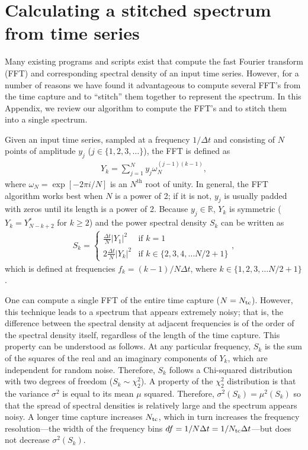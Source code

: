 \chapter{Calculating a stitched spectrum from time series}
\label{App:stitch_spec}

Many existing programs and scripts exist that compute the fast Fourier transform (FFT) and corresponding spectral density of an input time series. However, for a number of reasons we have found it advantageous to compute several FFT's from the time capture and to ``stitch'' them together to represent the spectrum. In this Appendix, we review our algorithm to compute the FFT's and to stitch them into a single spectrum.

Given an input time series, sampled at a frequency $1/\Delta t$ and consisting of $N$ points of amplitude $y_j$ ($j \in \{1, 2, 3, \ldots\}$), the FFT is defined as
\begin{align}\label{eqn:defFFT}
Y_k = \sum_{j=1}^N y_j \omega_N^{(j-1)(k-1)},
\end{align}
where $\omega_N = \exp[-2\pi i/N]$ is an $N^\text{th}$ root of unity. In general, the FFT algorithm works best when $N$ is a power of 2; if it is not, $y_j$ is usually padded with zeros until its length is a power of 2. Because $y_j \in \mathbb{R}$, $Y_k$ is symmetric ($Y_{k} = Y_{N-k+2}^*$ for $k \ge 2$) and the power spectral density $S_k$ can be written as
\begin{align}
S_k =
  \begin{cases}
   \frac{\Delta t}{N} |Y_1|^2 &\text{if } k = 1 \\
   2\frac{\Delta t}{N} |Y_k|^2 &\text{if } k \in \{2, 3, 4, \ldots N/2 + 1 \}
  \end{cases},
\end{align}
which is defined at frequencies $f_k = (k-1)/N \Delta t$, where $k \in \{1, 2, 3, \ldots N/2 + 1 \}$.

One can compute a single FFT of the entire time capture ($N = N_\text{tc}$). However, this technique leads to a spectrum that appears extremely noisy; that is, the difference between the spectral density at adjacent frequencies is of the order of the spectral density itself, regardless of the length of the time capture. This property can be understood as follows. At any particular frequency, $S_k$ is the sum of the squares of the real and an imaginary components of $Y_k$, which are independent for random noise. Therefore, $S_k$ follows a Chi-squared distribution with two degrees of freedom ($S_k \sim \chi_2^2$). A property of the $\chi_2^2$ distribution is that the variance $\sigma^2$ is equal to its mean $\mu$ squared. Therefore, $\sigma^2(S_k) = \mu^2(S_k)$ so that the spread of spectral densities is relatively large and the spectrum appears noisy. A longer time capture increases $N_\text{tc}$, which in turn increases the frequency resolution---the width of the frequency bins $df = 1/N\Delta t = 1/N_\text{tc}\Delta t$---but does not decrease $\sigma^2(S_k)$.

